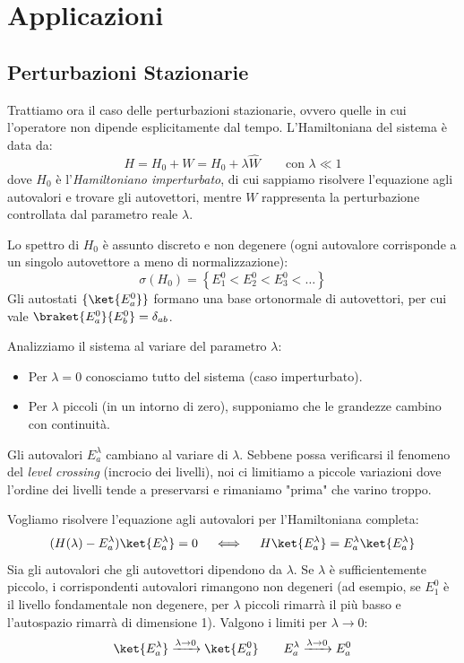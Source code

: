 \chapter{Applicazioni}

\section{Perturbazioni Stazionarie}

Trattiamo ora il caso delle perturbazioni stazionarie, ovvero quelle in cui l'operatore non dipende esplicitamente dal tempo.
L'Hamiltoniana del sistema è data da:
\begin{equation}
    H = H_0 + W = H_0 + \lambda \hat{W} \qquad \text{con } \lambda \ll 1
\end{equation}
dove $H_0$ è l'\textit{Hamiltoniano imperturbato}, di cui sappiamo risolvere l'equazione agli autovalori e trovare gli autovettori, mentre $W$ rappresenta la perturbazione controllata dal parametro reale $\lambda$.

Lo spettro di $H_0$ è assunto discreto e non degenere (ogni autovalore corrisponde a un singolo autovettore a meno di normalizzazione):
\[
    \sigma(H_0) = \left\{ E_1^0 < E_2^0 < E_3^0 < \dots \right\}
\]
Gli autostati $\{ \ket{E_a^0} \}$ formano una base ortonormale di autovettori, per cui vale $\braket{E_a^0}{E_b^0} = \delta_{ab}$.

Analizziamo il sistema al variare del parametro $\lambda$:
\begin{itemize}
    \item Per $\lambda = 0$ conosciamo tutto del sistema (caso imperturbato).
    \item Per $\lambda$ piccoli (in un intorno di zero), supponiamo che le grandezze cambino con continuità.
\end{itemize}
Gli autovalori $E_a^\lambda$ cambiano al variare di $\lambda$. Sebbene possa verificarsi il fenomeno del \textit{level crossing} (incrocio dei livelli), noi ci limitiamo a piccole variazioni dove l'ordine dei livelli tende a preservarsi e rimaniamo "prima" che varino troppo.

Vogliamo risolvere l'equazione agli autovalori per l'Hamiltoniana completa:
\begin{equation}
    \label{eq: pertubazioni}
    (H(\lambda) - E_a^\lambda) \ket{E_a^\lambda} = 0 \quad \iff \quad H\ket{E_a^\lambda} = E_a^\lambda \ket{E_a^\lambda}
\end{equation}
Sia gli autovalori che gli autovettori dipendono da $\lambda$. Se $\lambda$ è sufficientemente piccolo, i corrispondenti autovalori rimangono non degeneri (ad esempio, se $E_1^0$ è il livello fondamentale non degenere, per $\lambda$ piccoli rimarrà il più basso e l'autospazio rimarrà di dimensione 1).
Valgono i limiti per $\lambda \to 0$:
\[
    \ket{E_a^\lambda} \xrightarrow{\lambda \to 0} \ket{E_a^0} \qquad E_a^\lambda \xrightarrow{\lambda \to 0} E_a^0
\]

